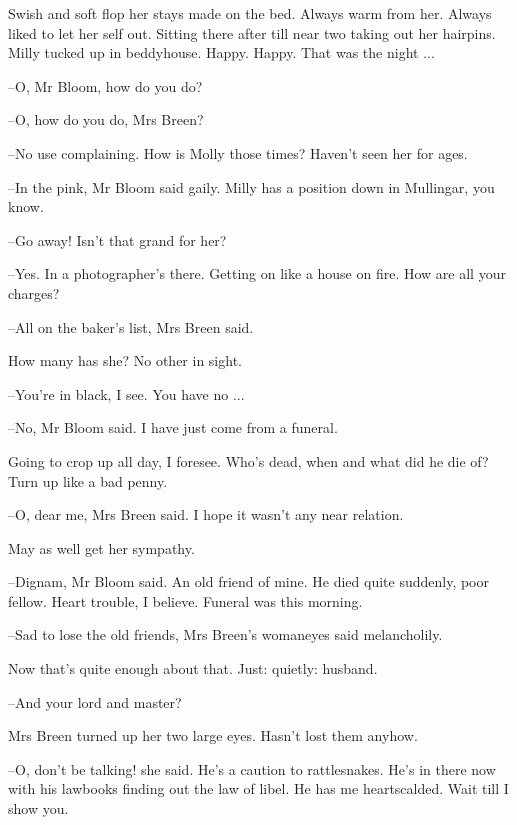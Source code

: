 Swish and soft flop her stays made on the bed.
Always warm from her.
Always liked to let her self out.
Sitting there after till near two taking out her hairpins.
Milly tucked up in beddyhouse.
Happy.
Happy.
That was the night ...

--O, Mr Bloom, how do you do?

--O, how do you do, Mrs Breen?

--No use complaining.
How is Molly those times?
Haven't seen her for ages.

--In the pink,
Mr Bloom said gaily.
Milly has a position down in Mullingar, you know.

--Go away!
Isn't that grand for her?

--Yes.
In a photographer's there.
Getting on like a house on fire.
How are all your charges?%

--All on the baker's list,
Mrs Breen said.

How many has she?
No other in sight.

--You're in black, I see.
You have no ...

--No,
Mr Bloom said.
I have just come from a funeral.

Going to crop up all day, I foresee.
Who's dead,
when and what did he die of?
Turn up like a bad penny.

--O, dear me,
Mrs Breen said.
I hope it wasn't any near relation.

May as well get her sympathy.

--Dignam,
Mr Bloom said.
An old friend of mine.
He died quite suddenly,
poor fellow.
Heart trouble, I believe.
Funeral was this morning.




--Sad to lose the old friends,
Mrs Breen's womaneyes said melancholily.

Now that's quite enough about that.
Just:
quietly:
husband.

--And your lord and master?

Mrs Breen turned up her two large eyes.
Hasn't lost them anyhow.

--O, don't be talking!
she said.
He's a caution to rattlesnakes.
He's in there now with his lawbooks finding out the law of libel.
He has me heartscalded.
Wait till I show you.

